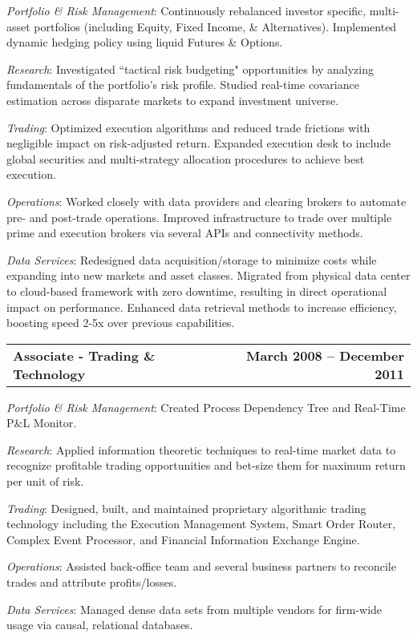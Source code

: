\documentclass[12pt]{article}
\begin{document}
    \begin{list}{}{\leftmargin=1em}
      \item \textit{Portfolio \& Risk Management}: Continuously rebalanced
        investor specific, multi-asset portfolios (including Equity, Fixed Income,
        \& Alternatives). Implemented dynamic hedging policy using liquid Futures \& Options.
      \item \textit{Research}: Investigated ``tactical risk budgeting" opportunities
        by analyzing fundamentals of the portfolio's risk profile. Studied real-time
        covariance estimation across disparate markets to expand investment universe. 
      \item \textit{Trading}: Optimized execution algorithms and reduced trade
        frictions with negligible impact on risk-adjusted return. Expanded execution
        desk to include global securities and multi-strategy allocation procedures
        to achieve best execution.
      \item \textit{Operations}: Worked closely with data providers and clearing
        brokers to automate pre- and post-trade operations. Improved infrastructure
        to trade over multiple prime and execution brokers via several APIs and
        connectivity methods. 
      \item \textit{Data Services}: Redesigned data acquisition/storage to
        minimize costs while expanding into new markets and asset classes. Migrated
        from physical data center to cloud-based framework with zero downtime,
        resulting in direct operational impact on performance. Enhanced data
        retrieval methods to increase efficiency, boosting speed 2-5x over
        previous capabilities.
    \end{list}
  \begin{tabular*}{7.5in}{@{\extracolsep{\fill}}lr}
    \textbf{Associate - Trading \& Technology} & \textbf{March 2008 -- December 2011}
  \end{tabular*}
    \begin{list}{}{\leftmargin=1em}
      \item \textit{Portfolio \& Risk Management}: Created Process Dependency Tree and
        Real-Time P\&L Monitor.
      \item \textit{Research}: Applied information theoretic techniques to real-time
        market data to recognize profitable trading opportunities and bet-size them
        for maximum return per unit of risk.
      \item \textit{Trading}: Designed, built, and maintained proprietary algorithmic
        trading technology including the Execution Management System, Smart Order
        Router, Complex Event Processor, and Financial Information Exchange Engine.
      \item \textit{Operations}: Assisted back-office team and several
        business partners to reconcile trades and attribute profits/losses.
      \item \textit{Data Services}: Managed dense data sets from multiple vendors
        for firm-wide usage via causal, relational databases.
    \end{list}
\end{document}

